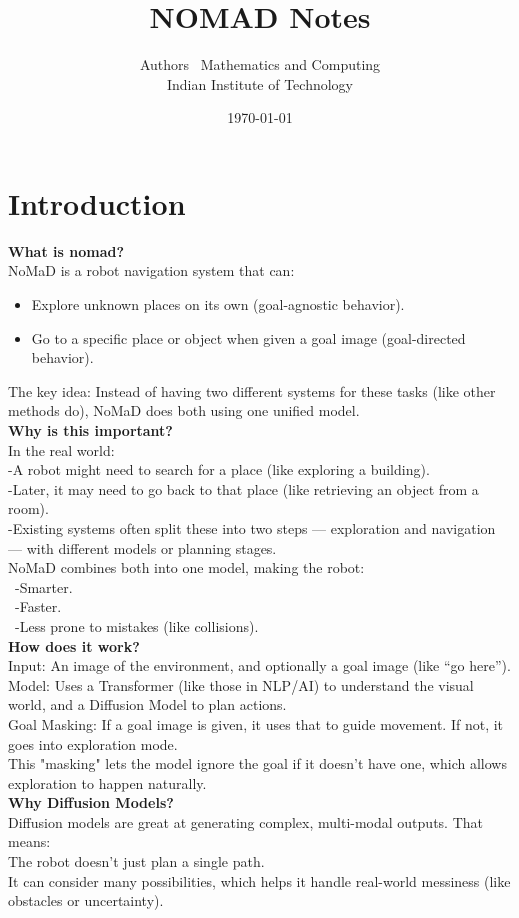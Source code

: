 \documentclass[12pt]{article}
\title{NOMAD Notes}
\author{Authors \ Mathematics and Computing \\ Indian Institute of Technology}
\date{\today}
\begin{document}
\maketitle
\section{Introduction}
\textbf{What is nomad?}\\
NoMaD is a robot navigation system that can:
\begin{itemize}
    \item Explore unknown places on its own (goal-agnostic behavior).
    \item Go to a specific place or object when given a goal image (goal-directed behavior).
\end{itemize}
The key idea: Instead of having two different systems for these tasks (like other methods do), NoMaD does both using one unified model.\\

\textbf{Why is this important?}\\

In the real world:\\
-A robot might need to search for a place (like exploring a building).\\
-Later, it may need to go back to that place (like retrieving an object from a room).\\
-Existing systems often split these into two steps — exploration and navigation — with different models or planning stages.\\
NoMaD combines both into one model, making the robot:\\
\ -Smarter.\\
\ -Faster.\\
\ -Less prone to mistakes (like collisions).\\

\textbf{How does it work?}\\

Input: An image of the environment, and optionally a goal image (like “go here”).\\
Model: Uses a Transformer (like those in NLP/AI) to understand the visual world, and a Diffusion Model to plan actions.\\
Goal Masking: If a goal image is given, it uses that to guide movement. If not, it goes into exploration mode.\\
This "masking" lets the model ignore the goal if it doesn't have one, which allows exploration to happen naturally.\\

\textbf{Why Diffusion Models?}\\
Diffusion models are great at generating complex, multi-modal outputs. That means:\\
The robot doesn’t just plan a single path.\\
It can consider many possibilities, which helps it handle real-world messiness (like obstacles or uncertainty).\\
\end{document}
